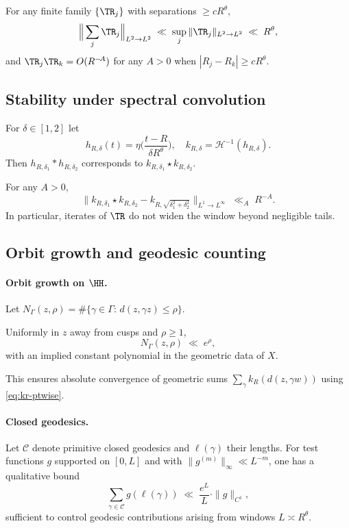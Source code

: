 \begin{corollary}\label{cor:windows-orth}
For any finite family $\{\TR_j\}$ with separations $\ge cR^\theta$,
\[
\Big\|\sum_j \TR_j\Big\|_{L^2\to L^2} \;\ll\; \sup_j \|\TR_j\|_{L^2\to L^2}
\;\ll\; R^\theta,
\]
and $\TR_j\TR_k=O(R^{-\!A})$ for any $A>0$ when $|R_j-R_k|\ge cR^\theta$.
\end{corollary}

\subsection{Stability under spectral convolution}
\label{app:aux:convolution}

For $\delta\in[1,2]$ let
\[
h_{R,\delta}(t)=\eta\!\Big(\frac{t-R}{\delta R^\theta}\Big),
\quad k_{R,\delta}=\mathcal{H}^{-1}(h_{R,\delta}).
\]
Then $h_{R,\delta_1}*h_{R,\delta_2}$ corresponds to
$k_{R,\delta_1}\star k_{R,\delta_2}$.

\begin{lemma}\label{lem:conv-stab}
For any $A>0$,
\[
\big\|k_{R,\delta_1}\star k_{R,\delta_2}
- k_{R,\sqrt{\delta_1^2+\delta_2^2}}\big\|_{L^1\to L^\infty}
\;\ll_A\; R^{-\!A}.
\]
In particular, iterates of $\TR$ do not widen the window beyond negligible tails.
\end{lemma}

\subsection{Orbit growth and geodesic counting}
\label{app:aux:counting}

\paragraph{Orbit growth on $\HH$.}
Let $N_\Gamma(z,\rho)=\#\{\gamma\in\Gamma:\, d(z,\gamma z)\le \rho\}$.

\begin{lemma}\label{lem:lattice}
Uniformly in $z$ away from cusps and $\rho\ge 1$,
\[
N_\Gamma(z,\rho)\;\ll\; e^\rho,
\]
with an implied constant polynomial in the geometric data of $X$.
\end{lemma}

This ensures absolute convergence of geometric sums
$\sum_{\gamma} k_R(d(z,\gamma w))$ using \eqref{eq:kr-ptwise}.

\paragraph{Closed geodesics.}
Let $\mathcal{C}$ denote primitive closed geodesics and $\ell(\gamma)$ their lengths.
For test functions $g$ supported on $[0,L]$ and with $\|g^{(m)}\|_\infty\ll L^{-m}$,
one has a qualitative bound
\begin{equation}\label{eq:geod-sum}
\sum_{\gamma\in\mathcal{C}} g(\ell(\gamma))
\;\ll\; \frac{e^{L}}{L} \cdot \|g\|_{C^1},
\end{equation}
sufficient to control geodesic contributions arising from windows $L\asymp R^\theta$.

